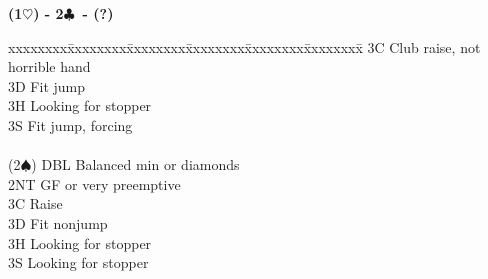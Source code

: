 \documentclass[10pt]{article}
\renewcommand{\c}{$\clubsuit$}
\newcommand{\h}{$\heartsuit$}
\newcommand{\s}{$\spadesuit$}
\newenvironment{bidtable}[1][]
{\textbf{#1}
  \begin{adjustwidth}{1em}{}
    \addvspace{2pt}
    \begin{tabbing}
      xxxxxxxx\=xxxxxxxx\=xxxxxxxx\=xxxxxxxx\=xxxxxxxx\=xxxxxxxx\=\kill}
{\end{tabbing}\end{adjustwidth}\bigskip}%
\begin{document}
\begin{multicols*}{2}
\begin{bidtable}[(1\h) - 2\c\ - (?)]
      \> 3C   \> Club raise, not horrible hand                                 \\
      \> 3D   \> Fit jump                                                      \\
      \> 3H   \> Looking for stopper                                           \\
      \> 3S   \> Fit jump, forcing                                             \\
                                                                               \\
(2\s) \> DBL  \> Balanced min or diamonds                                      \\
      \> 2NT  \> GF or very preemptive                                         \\
      \> 3C   \> Raise                                                         \\
      \> 3D   \> Fit nonjump                                                   \\
      \> 3H   \> Looking for stopper                                           \\
      \> 3S   \> Looking for stopper
\end{bidtable}


\end{multicols*}
\end{document}
